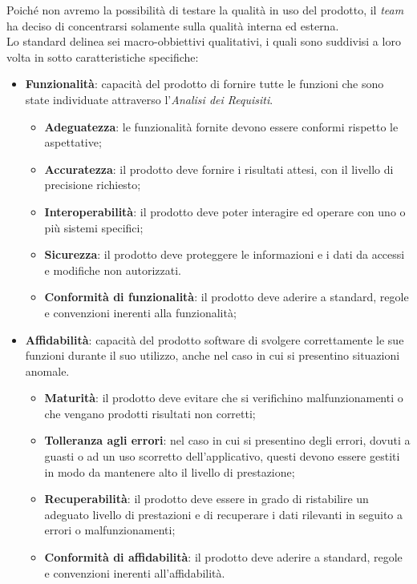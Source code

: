 Poiché non avremo la possibilità di testare la qualità in uso del prodotto, il \textit{team} ha deciso di concentrarsi solamente sulla qualità interna ed esterna. \\ Lo standard delinea sei macro-obbiettivi qualitativi, i quali sono suddivisi a loro volta in sotto caratteristiche specifiche:
\begin{itemize}
\item\textbf{Funzionalità}: capacità del prodotto di fornire tutte le funzioni che sono state individuate attraverso l'\textit{Analisi dei Requisiti}.
\begin{itemize}
\item\textbf{Adeguatezza}: le funzionalità fornite devono essere conformi rispetto le aspettative;
\item\textbf{Accuratezza}: il prodotto deve fornire i risultati attesi, con il livello di precisione richiesto;
\item\textbf{Interoperabilità}: il prodotto deve poter interagire ed operare con uno o più sistemi specifici;
\item\textbf{Sicurezza}: il prodotto deve proteggere le informazioni e i dati da accessi e modifiche non autorizzati.
\item\textbf{Conformità di funzionalità}: il prodotto deve aderire a standard, regole e convenzioni inerenti alla funzionalità;
\end{itemize}
\item\textbf{Affidabilità}: capacità del prodotto software di svolgere correttamente le sue funzioni durante il suo utilizzo, anche nel caso in cui si presentino situazioni anomale.
\begin{itemize}
\item\textbf{Maturità}: il prodotto deve evitare che si verifichino malfunzionamenti o che vengano prodotti risultati non corretti;
\item\textbf{Tolleranza agli errori}: nel caso in cui si presentino degli errori, dovuti a guasti o ad un uso scorretto dell'applicativo, questi devono essere gestiti in modo da mantenere alto il livello di prestazione;
\item\textbf{Recuperabilità}: il prodotto deve essere in grado di ristabilire un
adeguato livello di prestazioni e di recuperare i dati rilevanti in seguito a errori o malfunzionamenti;
\item\textbf{Conformità di affidabilità}: il prodotto deve aderire a standard, regole e convenzioni inerenti all'affidabilità.
\end{itemize}

\end{itemize}
